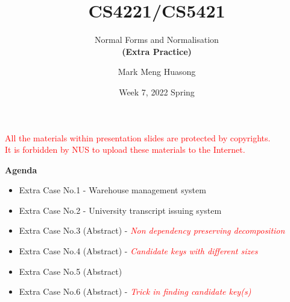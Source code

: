 
\title{CS4221/CS5421}

\subtitle{Normal Forms and Normalisation\\ \textbf{(Extra Practice)}}

\author{Mark Meng Huasong}



\date{Week 7, 2022 Spring}

\begin{frame}
	\titlepage
	\begin{tcolorbox}
		\begin{center}
			{\scriptsize \textcolor{red}{All the materials within presentation slides are protected by copyrights.\\
					It is forbidden by NUS to upload these materials to the Internet.}}
		\end{center}
	\end{tcolorbox}
\end{frame}

\begin{frame}
	{\large \textbf{Agenda}}
	\begin{itemize}
		\item Extra Case No.1 - Warehouse management system
		\item Extra Case No.2 - University transcript issuing system
		\item Extra Case No.3 (Abstract) - \textcolor{red}{\textit{\footnotesize Non dependency preserving decomposition}}
		\item Extra Case No.4 (Abstract) - \textcolor{red}{\textit{\footnotesize Candidate keys with different sizes}}
		\item Extra Case No.5 (Abstract) 
		\item Extra Case No.6 (Abstract) - \textcolor{red}{\textit{\footnotesize Trick in finding candidate key(s)}}
		
	\end{itemize}\vspace{20pt}

\end{frame}

